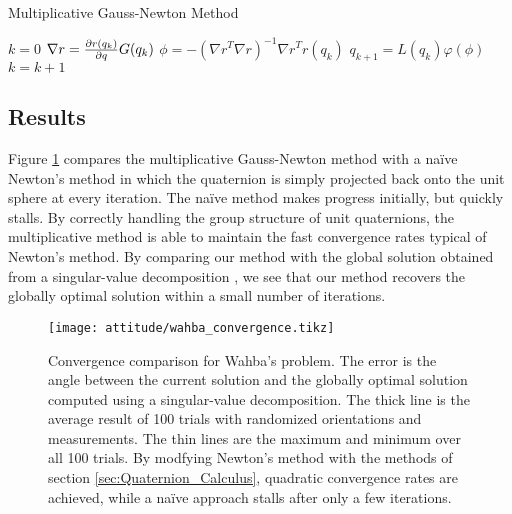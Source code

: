 \documentclass[../root.tex]{subfiles}
\begin{document}
    \begin{algorithm} 
    	\begin{algorithmic}[1]
    		\caption{Multiplicative Gauss-Newton Method}\label{alg:mgn}
    		\State $k = 0$
    		    \State ${\nabla r} = \pdv{r(q_k)}{q} G(q_k)$ 
    		    \State $ \phi = -({\nabla r}^T {\nabla r})^{-1} {\nabla r}^T r(q_k)$ 
    		    \State $q_{k+1} = L(q_k) \varphi(\phi)$ 
    		    \State $k = k + 1$
    		\EndWhile
    	\end{algorithmic}
    \end{algorithm}

    \subsection{Results} 
    
    Figure \ref{fig:wahba_convergence} compares the multiplicative
    Gauss-Newton method with a na\"ive Newton's method in which the
    quaternion is simply projected back onto the unit sphere at every
    iteration. The na\"ive method makes progress initially, but quickly
    stalls. By correctly handling the group structure of unit quaternions,
    the multiplicative method is able to maintain the fast convergence rates
    typical of Newton's method. By comparing our method with the global
    solution obtained from a singular-value decomposition
    \cite{markley_How_1999}, we see that our method recovers the globally
    optimal solution within a small number of iterations.
    
    \begin{figure}
        \centering
        \texttt{[image: attitude/wahba\_convergence.tikz]}
        \caption{Convergence comparison for Wahba's problem. The error
        is the angle between the current solution and the globally optimal
        solution computed using a singular-value decomposition.
        The thick line is the average result of 100 trials with randomized
        orientations and measurements. The thin lines are the maximum and
        minimum over all 100 trials. By modfying Newton's method with the
        methods of section \ref{sec:Quaternion_Calculus}, quadratic
        convergence rates are achieved, while a na\"ive approach stalls after
        only a few iterations.}
        \label{fig:wahba_convergence}
    \end{figure}
\end{document}
